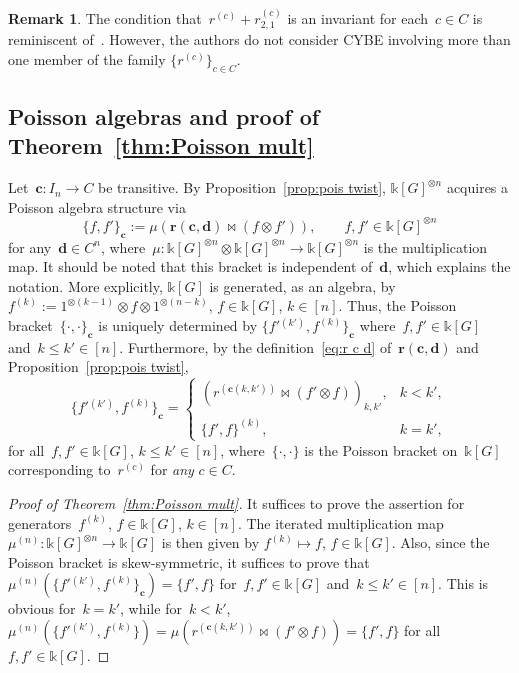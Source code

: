 \documentclass[12pt, reqno]{amsart}
\theoremstyle{definition}
\newtheorem{remark}[theorem]{Remark}
\numberwithin{equation}{section}
\newcommand{\tensor}{\otimes}
\newcommand{\kk}{\mathbb{k}}\newcommand{\lie}[1]{{\mathfrak{#1}}}
\begin{document}
\begin{remark}
The condition that~$r^{(c)}+r_{2,1}^{(c)}$ is an invariant
for each~$c\in C$ is reminiscent of~\cite{FR}. However,
the authors do not consider CYBE involving more than one member of the family $\{r^{(c)}\}_{c\in C}$.
\end{remark}

\subsection{Poisson algebras and proof of Theorem~\ref{thm:Poisson mult}}\label{subs:Poisson}
Let~$\mathbf c:I_n\to C$ be transitive. By Proposition~\ref{prop:pois twist}, $\kk[G]^{\tensor n}$
acquires a Poisson algebra structure via
$$
\{ f,f'\}_{\mathbf c}:=\mu( \mathbf r(\mathbf c,\boldsymbol d)\bowtie (f\tensor f')),\qquad f,f'\in\kk[G]^{\tensor n}
$$
for any~$\boldsymbol d\in C^n$, where~$\mu:\kk[G]^{\tensor n}\tensor\kk[G]^{\tensor n}\to \kk[G]^{\tensor n}$ is the multiplication map. It should be noted that this bracket is independent of~$\boldsymbol d$, which explains the notation. More explicitly, $\kk[G]$ is 
generated, as an algebra, by $f^{(k)}:=1^{\tensor(k-1)}\tensor f\tensor 1^{\tensor (n-k)}$, $f\in\kk[G]$,
$k\in[n]$. Thus, the Poisson bracket~$\{\cdot,\cdot\}_{\mathbf c}$ is uniquely determined
by $\{f'{}^{(k')},f^{(k)}\}_{\mathbf c}$ where~$f,f'\in\kk[G]$ and~$k\le k'\in [n]$.
Furthermore, by the definition~\eqref{eq:r c d} of~$\mathbf r(\mathbf c,\boldsymbol d)$ and Proposition~\ref{prop:pois twist},
\begin{equation}\label{eq:c Poi bracket}
\{ f'{}^{(k')},f^{(k)}\}_{\mathbf c}=
\begin{cases}
(r^{(\mathbf c(k,k'))}\bowtie(f'\tensor f))_{k,k'},&k<k',\\
\{f',f\}^{(k)},&k=k',
\end{cases}
\end{equation}
for all~$f,f'\in\kk[G]$, $k\le k'\in [n]$, where~$\{\cdot,\cdot\}$ is the Poisson bracket on~$\kk[G]$
corresponding to~$r^{(c)}$ for {\em any} $c\in C$.
\begin{proof}[Proof of Theorem~\ref{thm:Poisson mult}]
It suffices to prove the assertion for
generators~$f^{(k)}$, $f\in\kk[G]$, $k\in[n]$. The iterated multiplication map
$\mu^{(n)}:\kk[G]^{\tensor n}\to \kk[G]$ is then given by 
$f^{(k)}\mapsto f$, $f\in \kk[G]$. Also, since the Poisson bracket is skew-symmetric, it suffices to prove that $\mu^{(n)}(\{f'{}^{(k')},f^{(k)}\}_{\mathbf c})=\{f',f\}$
for~$f,f'\in\kk[G]$ and~$k\le k'\in[n]$. This is obvious for~$k=k'$, while for~$k<k'$,
$\mu^{(n)}(\{f'{}^{(k')},f^{(k)}\})=\mu(r^{(\mathbf c(k,k'))}\bowtie (f'\tensor f))=\{f',f\}$ for all~$f,f'\in\kk[G]$.
\end{proof}
\end{document}
